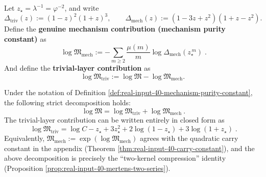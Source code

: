 \begin{definition}\label{def:real-input-40-mechanism-purity-constant}
Let \(z_\star=\lambda^{-1}=\varphi^{-2}\), and write
\[
\Delta_{\mathrm{triv}}(z):=(1-z)^2(1+z)^3,\qquad
\Delta_{\mathrm{mech}}(z):=(1-3z+z^2)(1+z-z^2).
\]
Define the \textbf{genuine mechanism contribution (mechanism purity constant)} as
\[
\boxed{\;
\log\mathfrak{M}_{\mathrm{mech}}
:=
-\sum_{m\ge 2}\frac{\mu(m)}{m}\log \Delta_{\mathrm{mech}}(z_\star^{\,m})
\; }.
\]
And define the \textbf{trivial-layer contribution} as
\[
\boxed{\;
\log\mathfrak{M}_{\mathrm{triv}}
:=\log\mathfrak{M}-\log\mathfrak{M}_{\mathrm{mech}}.\;}
\]
\end{definition}

\begin{proposition}\label{prop:real-input-40-triv-mech-split}
Under the notation of Definition \ref{def:real-input-40-mechanism-purity-constant}, the following strict decomposition holds:
\[
\boxed{\ \log\mathfrak{M}=\log\mathfrak{M}_{\mathrm{triv}}+\log\mathfrak{M}_{\mathrm{mech}}\ }.
\]
The trivial-layer contribution can be written entirely in closed form as
\[
\boxed{\;
\log\mathfrak{M}_{\mathrm{triv}}
=\log C-z_\star+3z_\star^2+2\log(1-z_\star)+3\log(1+z_\star)\; }.
\]
Equivalently, \(\mathfrak{M}_{\mathrm{mech}}:=\exp(\log\mathfrak{M}_{\mathrm{mech}})\) agrees with the quadratic carry constant in the appendix (Theorem \ref{thm:real-input-40-carry-constant}), and the above decomposition is precisely the ``two-kernel compression'' identity (Proposition \ref{prop:real-input-40-mertens-two-series}).
\end{proposition}

